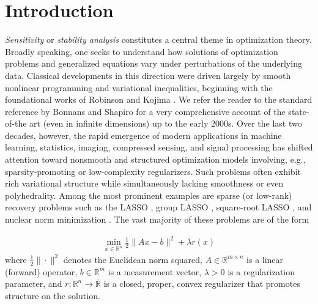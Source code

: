 \documentclass[reqno]{amsart}
\numberwithin{equation}{section}
\newcommand{\R}{\mathbb{R}}
\begin{document}


\maketitle
\section{Introduction}


{\em Sensitivity} or  {\em stability analysis} constitutes a central theme in optimization theory. Broadly speaking, one seeks to understand how solutions of optimization problems and generalized equations vary under perturbations of the underlying data. Classical developments in this direction were driven largely by smooth nonlinear programming and variational inequalities, beginning with the foundational works of Robinson \cite{Rob 80, Rob 84, Rob 87} and   Kojima \cite{Koj 80}. We refer the reader to the standard reference by Bonnans and Shapiro \cite{BS 00} for  a very comprehensive account of the state-of-the art  (even in infinite dimensions) up to the early 2000s. Over the last two decades, however, the rapid emergence of modern applications in machine learning, statistics, imaging, compressed sensing, and signal processing has shifted attention toward nonsmooth and structured optimization models involving, e.g.,  sparsity-promoting or low-complexity regularizers. Such problems often exhibit rich variational structure while simultaneously lacking smoothness or even polyhedrality.
Among the most prominent examples are sparse (or low-rank) recovery problems such as the LASSO \cite{SaS 86, T 96}, group LASSO \cite{MiL 06}, square-root LASSO \cite{BCW 11, BCW 14}, and nuclear norm minimization \cite{CaR 09, Faz 02, RFP 10}. The vast majority of these problems are of the form 

\begin{align}\label{eq:generalLeastSquares}
    \min_{x \in \R^n}  \frac{1}{2}\|Ax-b\|^2 + \lambda r(x)
\end{align} where  $\frac{1}{2}\|\cdot\|^2$ denotes the Euclidean norm squared,  $A \in \R^{m \times n}$ is a linear (forward) operator, $b \in \R^m$ is a measurement vector,  $\lambda > 0$ is a regularization parameter,
and $r : \R^n \to \overline{\R}$ is a closed, proper,  convex regularizer that promotes structure on the solution.
\end{document}

